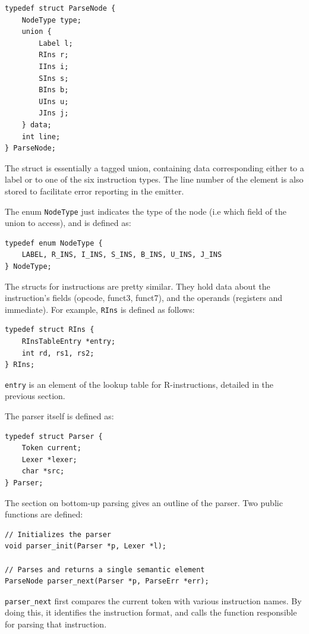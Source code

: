 \documentclass{article}
\begin{document}
\begin{verbatim}    
typedef struct ParseNode {	
    NodeType type;
    union {
        Label l;
        RIns r;
        IIns i;
        SIns s;
        BIns b;
        UIns u;
        JIns j;
    } data;
    int line;
} ParseNode;
\end{verbatim}

The struct is essentially a tagged union, containing data corresponding either to a label or 
to one of the six instruction types. The line number of the element is also stored to
facilitate error reporting in the emitter.

The enum \texttt{NodeType} just indicates the type of the node (i.e which field of the union to
access), and is defined as:

\begin{verbatim}
typedef enum NodeType {
    LABEL, R_INS, I_INS, S_INS, B_INS, U_INS, J_INS
} NodeType;
\end{verbatim}

The structs for instructions are pretty similar. They hold
data about the instruction's fields (opcode, funct3, funct7),
and the operands (registers and immediate). For example,
\texttt{RIns} is defined as follows:

\begin{verbatim}
typedef struct RIns {
    RInsTableEntry *entry;
    int rd, rs1, rs2;
} RIns;
\end{verbatim}

\texttt{entry} is an element of the lookup table for R-instructions,
detailed in the previous section.

The parser itself is defined as:

\begin{verbatim}
typedef struct Parser {
    Token current;
    Lexer *lexer;
    char *src;
} Parser;
\end{verbatim}

The section on bottom-up parsing gives an outline of the parser.
Two public functions are defined:
\begin{verbatim}
// Initializes the parser
void parser_init(Parser *p, Lexer *l);

// Parses and returns a single semantic element
ParseNode parser_next(Parser *p, ParseErr *err);
\end{verbatim}

\texttt{parser\_next} first compares the current token
with various instruction names. By doing this, it
identifies the instruction format, and calls the function
responsible for parsing that instruction.
\end{document}
